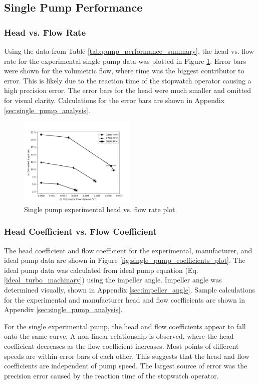 \subsection{Single Pump Performance}
\subsubsection{Head vs. Flow Rate}
Using the data from Table \ref{tab:pump_performance_summary}, the head vs. flow rate for the experimental single pump data was plotted in Figure \ref{fig:single_pump_plot}. Error bars were shown for the volumetric flow, where time was the biggest contributor to error. This is likely due to the reaction time of the stopwatch operator causing a high precision error. The error bars for the head were much smaller and omitted for visual clarity. Calculations for the error bars are shown in Appendix \ref{sec:single_pump_analysis}. 
\begin{figure}[]
    \centering
    \includegraphics[width=0.5\textwidth]{Sections/Figures/Single Pump Plot.png}
    \caption{Single pump experimental head vs. flow rate plot.}
    \label{fig:single_pump_plot}
\end{figure}

\subsubsection{Head Coefficient vs. Flow Coefficient}
The head coefficient and flow coefficient for the experimental, manufacturer, and ideal pump data are shown in Figure \ref{fig:single_pump_coefficients_plot}. The ideal pump data was calculated from ideal pump equation (Eq. \ref{ideal_turbo_machinary}) using the impeller angle. Impeller angle was determined visually, shown in Appendix \ref{sec:impeller_angle}. Sample calculations for the experimental and manufacturer head and flow coefficients are shown in Appendix \ref{sec:single_pump_analysis}.

For the single experimental pump, the head and flow coefficients appear to fall onto the same curve. A non-linear relationship is observed, where the head coefficient decreases as the flow coefficient increases. Most points of different speeds are within error bars of each other. This suggests that the head and flow coefficients are independent of pump speed. The largest source of error was the precision error caused by the reaction time of the stopwatch operator.


